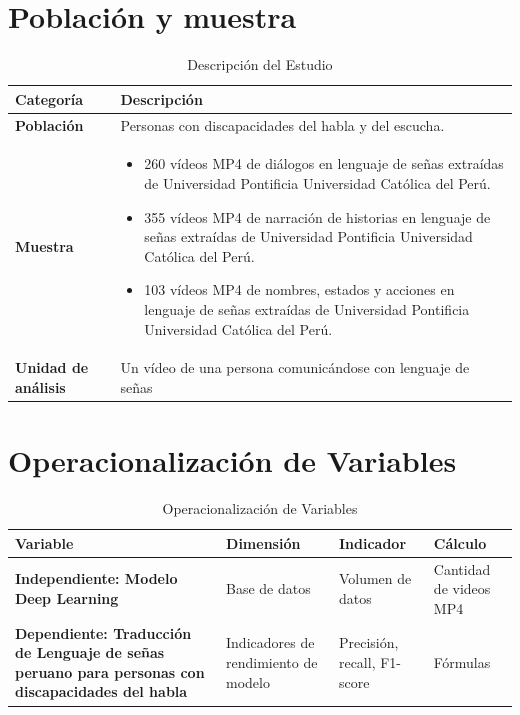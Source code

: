 \section{Población y muestra}

\begin{table}[h!]
	\centering
	\caption{Descripción del Estudio}
	\begin{tabular}{|>{\raggedright\arraybackslash}m{3cm}|>{\raggedright\arraybackslash}m{10cm}|}
		\hline
		\textbf{Categoría} & \textbf{Descripción} \\ \hline
		\textbf{Población} & Personas con discapacidades del habla y del escucha. \\ \hline
		\textbf{Muestra} & 
		\begin{itemize}
			\item 260 vídeos MP4 de diálogos en lenguaje de señas extraídas de Universidad Pontificia Universidad Católica del Perú.
			\item 355 vídeos MP4 de narración de historias en lenguaje de señas extraídas de Universidad Pontificia Universidad Católica del Perú.
			\item 103 vídeos MP4 de nombres, estados y acciones en lenguaje de señas extraídas de Universidad Pontificia Universidad Católica del Perú.
		\end{itemize}
		\\ \hline
		\textbf{Unidad de análisis} & Un vídeo de una persona comunicándose con lenguaje de señas \\ \hline
	\end{tabular}
\end{table}


\section{Operacionalización de Variables}

\begin{table}[h!]
	\centering
	\caption{Operacionalización de Variables}
	\begin{tabular}{|>{\raggedright\arraybackslash}m{4cm}|>{\raggedright\arraybackslash}m{4cm}|>{\raggedright\arraybackslash}m{4cm}|>{\raggedright\arraybackslash}m{4cm}|}
		\hline
		\textbf{Variable} & \textbf{Dimensión} & \textbf{Indicador} & \textbf{Cálculo} \\ \hline
		\textbf{Independiente: Modelo Deep Learning} 
		& Base de datos & Volumen de datos & Cantidad de videos MP4\\ \cline{2-4}
		
		\textbf{Dependiente: Traducción de Lenguaje de señas peruano para personas con discapacidades del habla} 
		& Indicadores de rendimiento de modelo & Precisión, recall, F1-score & Fórmulas \\ \hline
	\end{tabular}
\end{table}

